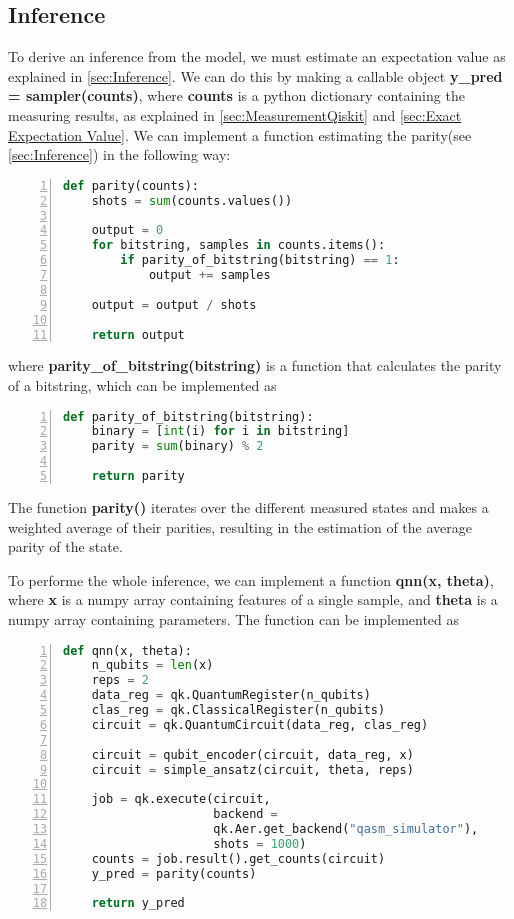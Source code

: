 \subsection{Inference}\label{sec:InferenceImplementation}
To derive an inference from the model, we must estimate an expectation value as explained in \autoref{sec:Inference}. We can do this by making a callable object \textbf{y\_pred = sampler(counts)}, where \textbf{counts} is a python dictionary containing the measuring results, as explained in \autoref{sec:MeasurementQiskit} and \autoref{sec:Exact Expectation Value}. We can implement a function estimating the parity(see \autoref{sec:Inference}) in the following way:

\begin{lstlisting}[language=python, numbers=left]
def parity(counts):
    shots = sum(counts.values())
    
    output = 0
    for bitstring, samples in counts.items():
        if parity_of_bitstring(bitstring) == 1:
            output += samples

    output = output / shots

    return output
\end{lstlisting}
where \textbf{parity\_of\_bitstring(bitstring)} is a function that calculates the parity of a bitstring, which can be implemented as 
\begin{lstlisting}[language=python, numbers=left]
def parity_of_bitstring(bitstring):
    binary = [int(i) for i in bitstring]
    parity = sum(binary) % 2
    
    return parity
\end{lstlisting}

The function \textbf{parity()} iterates over the different measured states and makes a weighted average of their parities, resulting in the estimation of the average parity of the state.

To performe the whole inference, we can implement a function \textbf{qnn(x, theta)}, where \textbf{x} is a numpy array containing features of a single sample, and \textbf{theta} is a numpy array containing parameters. The function can be implemented as 

\begin{lstlisting}[language=python, numbers=left]
def qnn(x, theta):
    n_qubits = len(x)
    reps = 2
    data_reg = qk.QuantumRegister(n_qubits)
    clas_reg = qk.ClassicalRegister(n_qubits)
    circuit = qk.QuantumCircuit(data_reg, clas_reg)
    
    circuit = qubit_encoder(circuit, data_reg, x)
    circuit = simple_ansatz(circuit, theta, reps)

    job = qk.execute(circuit, 
                     backend = 
                     qk.Aer.get_backend("qasm_simulator"),
                     shots = 1000)
    counts = job.result().get_counts(circuit)
    y_pred = parity(counts)
    
    return y_pred
\end{lstlisting}


